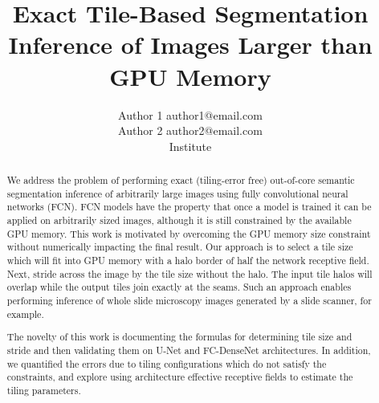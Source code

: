 \documentclass[twoside,11pt]{article}
\newif\ifcamera
\begin{document}
	
\title{Exact Tile-Based Segmentation Inference of Images Larger than GPU Memory}

\ifcamera
\author{\name Michael Majurski \email michael.majurski@nist.gov \\
	\name Peter Bajcsy \email peter.bajcsy@nist.gov \\
	\addr National Institute of Standards and Technology\\
	Information Technology Lab\\
	Gaithersburg, MD 20899, USA}
\else
\author{\name Author 1 \email author1@email.com \\
	\name Author 2 \email author2@email.com \\
	\addr Institute}
\fi


\maketitle

 
\begin{abstract}%

We address the problem of performing exact (tiling-error free) out-of-core semantic segmentation inference of arbitrarily large images using fully convolutional neural networks (FCN). FCN models have the property that once a model is trained it can be applied on arbitrarily sized images, although it is still constrained by the available GPU memory. This work is motivated by overcoming the GPU memory size constraint without numerically impacting the final result. 
Our approach is to select a tile size which will fit into GPU memory with a halo border of half the network receptive field. Next, stride across the image by the tile size without the halo. The input tile halos will overlap while the output tiles join exactly at the seams. Such an approach enables performing inference of whole slide microscopy images generated by a slide scanner, for example.

The novelty of this work is documenting the formulas for determining tile size and stride and then validating them on U-Net and FC-DenseNet architectures.
In addition, we quantified the errors due to tiling configurations which do not satisfy the constraints, and explore using architecture effective receptive fields to estimate the tiling parameters. 


\end{abstract}
\end{document}

